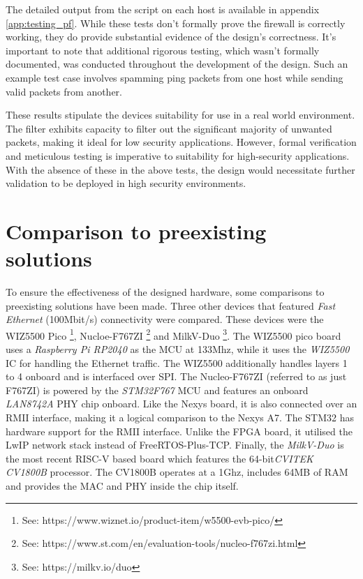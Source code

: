 The detailed output from the script on each host is available in appendix \ref{app:testing_pf}. While these tests don't formally prove the firewall is correctly working, they do provide substantial evidence of the design's correctness. It's important to note that additional rigorous testing, which wasn't formally documented, was conducted throughout the development of the design. Such an example test case involves spamming ping packets from one host while sending valid packets from another. 

These results stipulate the devices suitability for use in a real world environment. The filter exhibits capacity to filter out the significant majority of unwanted packets, making it ideal for low security applications. However, formal verification and meticulous testing is imperative to suitability for high-security applications. With the absence of these in the above tests, the design would necessitate further validation to be deployed in high security environments. 


















\section{Comparison to preexisting solutions}

To ensure the effectiveness of the designed hardware, some comparisons to preexisting solutions have been made. Three other devices that featured \textit{Fast Ethernet} (100Mbit/s) connectivity were compared. These devices were the WIZ5500 Pico \footnote[1]{See: https://www.wiznet.io/product-item/w5500-evb-pico/}, Nucloe-F767ZI \footnote[2]{See: https://www.st.com/en/evaluation-tools/nucleo-f767zi.html} and MilkV-Duo \footnote[3]{See: https://milkv.io/duo}. The WIZ5500 pico board uses a \textit{Raspberry Pi RP2040} as the MCU at 133Mhz, while it uses the \textit{WIZ5500} IC for handling the Ethernet traffic. The WIZ5500 additionally handles layers 1 to 4 onboard and is interfaced over SPI. The Nucleo-F767ZI (referred to as just F767ZI) is powered by the \textit{STM32F767} MCU and features an onboard \textit{LAN8742A} PHY chip onboard. Like the Nexys board, it is also connected over an RMII interface, making it a logical comparison to the Nexys A7. The STM32 has hardware support for the RMII interface. Unlike the FPGA board, it utilised the LwIP network stack instead of FreeRTOS-Plus-TCP. Finally, the \textit{MilkV-Duo} is the most recent RISC-V based board which features the 64-bit\textit{CVITEK CV1800B} processor. The CV1800B operates at a 1Ghz, includes 64MB of RAM and provides the MAC and PHY inside the chip itself.

